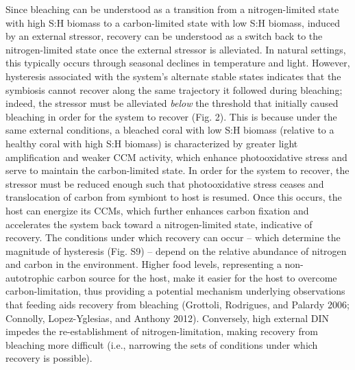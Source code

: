\documentclass[]{elsarticle} %
\begin{document}
Since bleaching can be understood as a transition from a
nitrogen-limited state with high S:H biomass to a carbon-limited state
with low S:H biomass, induced by an external stressor, recovery can be
understood as a switch back to the nitrogen-limited state once the
external stressor is alleviated. In natural settings, this typically
occurs through seasonal declines in temperature and light. However,
hysteresis associated with the system's alternate stable states
indicates that the symbiosis cannot recover along the same trajectory it
followed during bleaching; indeed, the stressor must be alleviated
\emph{below} the threshold that initially caused bleaching in order for
the system to recover (Fig. 2). This is because under the same external
conditions, a bleached coral with low S:H biomass (relative to a healthy
coral with high S:H biomass) is characterized by greater light
amplification and weaker CCM activity, which enhance photooxidative
stress and serve to maintain the carbon-limited state. In order for the
system to recover, the stressor must be reduced enough such that
photooxidative stress ceases and translocation of carbon from symbiont
to host is resumed. Once this occurs, the host can energize its CCMs,
which further enhances carbon fixation and accelerates the system back
toward a nitrogen-limited state, indicative of recovery. The conditions
under which recovery can occur -- which determine the magnitude of
hysteresis (Fig. S9) -- depend on the relative abundance of nitrogen and
carbon in the environment. Higher food levels, representing a
non-autotrophic carbon source for the host, make it easier for the host
to overcome carbon-limitation, thus providing a potential mechanism
underlying observations that feeding aids recovery from bleaching
(Grottoli, Rodrigues, and Palardy 2006; Connolly, Lopez-Yglesias, and
Anthony 2012). Conversely, high external DIN impedes the
re-establishment of nitrogen-limitation, making recovery from bleaching
more difficult (i.e., narrowing the sets of conditions under which
recovery is possible).
\end{document}
